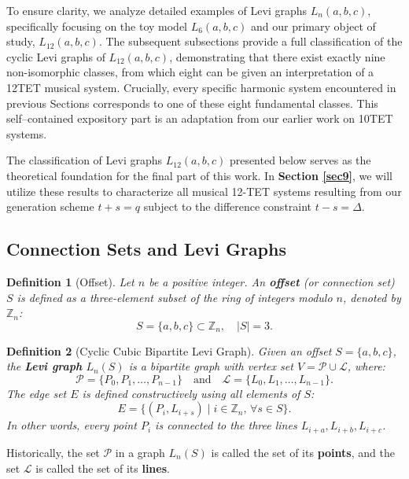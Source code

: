 \documentclass[12pt,letterpaper]{amsart}
\newtheorem{definition}{Definition}
\begin{document}
To ensure clarity, we analyze detailed examples of Levi graphs $L_n(a,b,c)$, specifically focusing on the toy model $L_6(a,b,c)$ and our primary object of study, $L_{12}(a,b,c)$. The subsequent subsections provide a full classification of the cyclic Levi graphs of $L_{12}(a,b,c)$, demonstrating that there exist exactly nine non-isomorphic classes, from which eight can be given an interpretation of a 12TET musical system. Crucially, every specific harmonic system encountered in previous Sections corresponds to one of these eight fundamental classes. This self--contained expository part is an adaptation from our earlier work \cite{Nurowski10TET} on 10TET systems. 

The classification of Levi graphs $L_{12}(a,b,c)$ presented below serves as the theoretical foundation for the final part of this work. In \textbf{Section \ref{sec9}}, we will utilize these results to characterize all musical 12-TET systems resulting from our generation scheme $t+s=q$ subject to the difference constraint $t-s=\Delta$.

\subsection{Connection Sets and Levi Graphs}

\begin{definition}[Offset]
Let $n$ be a positive integer. An \textbf{offset} (or connection set) $S$ is defined as a three-element subset of the ring of integers modulo $n$, denoted by $\mathbb{Z}_n$:
\[
S = \{a, b, c\} \subset \mathbb{Z}_n, \quad |S|=3.
\]
\end{definition}

\begin{definition}[Cyclic Cubic Bipartite Levi Graph]
Given an offset $S = \{a, b, c\}$, the \textbf{Levi graph} $L_n(S)$ is a bipartite graph with vertex set $V = \mathcal{P} \cup \mathcal{L}$, where:
\[
\mathcal{P} = \{P_0, P_1, \dots, P_{n-1}\} \quad \text{and} \quad \mathcal{L} = \{L_0, L_1, \dots, L_{n-1}\}.
\]
The edge set $E$ is defined constructively using all elements of $S$:
\[
E = \{ (P_i, L_{i+s}) \mid i \in \mathbb{Z}_n, \, \forall s \in S \}.
\]
In other words, every point $P_i$ is connected to the three lines $L_{i+a}, L_{i+b}, L_{i+c}$.
\end{definition}

Historically, the set $\mathcal P$ in a graph $L_n(S)$ is called the set of its \textbf{points}, and the set $\mathcal L$ is called the set of its \textbf{lines}.
\end{document}
